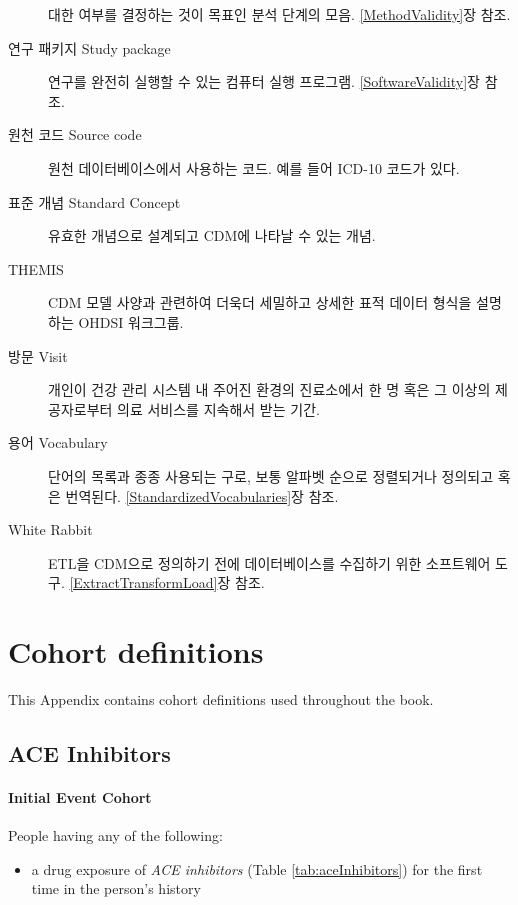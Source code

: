 \documentclass[10.5pt]{book}
\providecommand{\tightlist}{%
  \setlength{\itemsep}{0pt}\setlength{\parskip}{0pt}}
\theoremstyle{definition}
\theoremstyle{definition}
\theoremstyle{definition}
\theoremstyle{remark}
\begin{document}
\begin{description}
대한 여부를 결정하는 것이 목표인 분석 단계의 모음.
\ref{MethodValidity}장 참조.
\item[연구 패키지 Study package]
연구를 완전히 실행할 수 있는 컴퓨터 실행 프로그램.
\ref{SoftwareValidity}장 참조.
\item[원천 코드 Source code]
원천 데이터베이스에서 사용하는 코드. 예를 들어 ICD-10 코드가 있다.
\item[표준 개념 Standard Concept]
유효한 개념으로 설계되고 CDM에 나타날 수 있는 개념.
\item[THEMIS]
CDM 모델 사양과 관련하여 더욱더 세밀하고 상세한 표적 데이터 형식을
설명하는 OHDSI 워크그룹.
\item[방문 Visit]
개인이 건강 관리 시스템 내 주어진 환경의 진료소에서 한 명 혹은 그 이상의
제공자로부터 의료 서비스를 지속해서 받는 기간.
\item[용어 Vocabulary]
단어의 목록과 종종 사용되는 구로, 보통 알파벳 순으로 정렬되거나 정의되고
혹은 번역된다. \ref{StandardizedVocabularies}장 참조.
\item[White Rabbit]
ETL을 CDM으로 정의하기 전에 데이터베이스를 수집하기 위한 소프트웨어
도구. \ref{ExtractTransformLoad}장 참조.
\end{description}

\chapter{Cohort definitions}\label{CohortDefinitions}

This Appendix contains cohort definitions used throughout the book.

\section{ACE Inhibitors}\label{AceInhibitors}

\subsubsection*{Initial Event Cohort}\label{initial-event-cohort}

People having any of the following:

\begin{itemize}
\tightlist
\item
  a drug exposure of \emph{ACE inhibitors} (Table
  \ref{tab:aceInhibitors}) for the first time in the person's history
\end{itemize}
\end{document}
